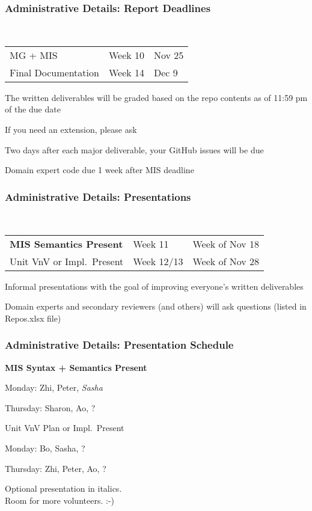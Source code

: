 \documentclass[t,12pt,numbers,fleqn]{beamer}
\begin{document}
\begin{frame}
\frametitle{Administrative Details: Report Deadlines}
~\newline
\begin{tabular}{l l l}
MG + MIS & Week 10 & Nov 25\\
Final Documentation & Week 14 & Dec 9\\
\end {tabular}

\bi
\item The written deliverables will be graded based on the repo contents as of
11:59 pm of the due date
\item If you need an extension, please ask
\item Two days after each major deliverable, your GitHub issues will be due
\item Domain expert code due 1 week after MIS deadline
\ei

\end{frame}


\begin{frame}
\frametitle{Administrative Details: Presentations}

~\newline
\begin{tabular}{l l l}
\textbf{MIS Semantics Present} & Week 11 & Week of Nov 18\\
Unit VnV or Impl.\ Present & Week 12/13 & Week of Nov 28\\
\end {tabular}

\bi
\item Informal presentations with the goal of improving everyone's written
  deliverables
\item Domain experts and secondary reviewers (and others) will ask questions
  (listed in Repos.xlsx file)
\ei

\end{frame}


\begin{frame}
\frametitle{Administrative Details: Presentation Schedule}

\bi
\item \textbf{MIS Syntax + Semantics Present}
\bi
\item Monday: Zhi, Peter, \emph{Sasha}
\item Thursday:  Sharon, Ao, ?
\ei
\item Unit VnV Plan or Impl.\ Present
\bi
\item Monday: Bo, Sasha, ?
\item Thursday: Zhi, Peter, Ao, ?
\ei
\ei

Optional presentation in italics.\\
Room for more volunteers.  :-)

\end{frame}
\end{document}
